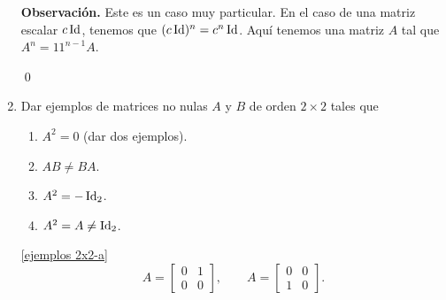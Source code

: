 \begin{enumerate}[topsep=6pt,itemsep=.4cm]
\noindent \textbf{Observación.} Este es un caso muy particular. En  el caso de una matriz escalar $c\operatorname{Id}$,  tenemos que  $(c\operatorname{Id})^n= c^n \operatorname{Id}$. Aquí tenemos una matriz $A$ tal que $A^n = 11^{n-1}A$.

\qed



\item\label{ejemplos 2x2}  Dar ejemplos de matrices no nulas $A$ y $B$ de orden $2\times2$ tales que
\begin{multicols}{2}
\begin{enumerate}[topsep=5pt,itemsep=5pt]
 \item\label{ejemplos 2x2-a} $A^2=0$ (dar dos ejemplos).
 \item\label{ejemplos 2x2-b} $AB\neq BA$.
 \item\label{ejemplos 2x2-c} $A^2=-\operatorname{Id}_2$.
 \item\label{ejemplos 2x2-d} $A^2=A\neq\operatorname{Id}_2$.
\end{enumerate}
\end{multicols}
\rta
 
\noindent\ref{ejemplos 2x2-a}
\begin{equation*}
    A = \begin{bmatrix}
        0 & 1\\ 0 & 0
        \end{bmatrix}, \qquad A = \begin{bmatrix}
            0 & 0\\ 1 & 0
            \end{bmatrix}.
\end{equation*}


\end{enumerate}
